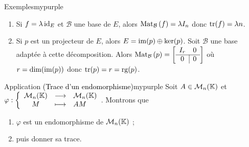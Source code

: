     \begin{omed}{Exemples}{mypurple}
        \begin{enumerate}[label=\textcolor{mypurple}{\arabic*.}]
            \item Si $f = \lambda \operatorname{id}_E$ et $\mathcal{B}$ une base de $E$, alors $\text{Mat}_{\mathcal{B}}\left(f\right) = \lambda I_n$ donc $\operatorname{tr}(f) = \lambda n$.
            \item Si $p$ est un projecteur de $E$, alors $E = \operatorname{im}(p) \oplus \ker(p)$. Soit $\mathcal{B}$ une base adaptée à cette décomposition. Alors $\text{Mat}_{\mathcal{B}}\left(p\right) = \left[ \begin{array}{c | c}
                I_r & 0 \\
                \hline
                0 & 0
            \end{array} \right]$ où $r = \dim(\operatorname{im}(p))$ donc $\operatorname{tr}(p) = r = \operatorname{rg}(p)$.
        \end{enumerate}
    \end{omed}

    \begin{omed}{Application \textcolor{black}{(Trace d’un endomorphisme)}}{mypurple}
        Soit $A \in \mathcal{M}_{n}(\mathbb{K})$ et $\fonction{\varphi}{\mk{n}}{\mk{n}}{M}{AM}$.
        Montrons que 
        \begin{enumerate}[label = \textcolor{mypurple}{\alph* |}]
            \item $\varphi$ est un endomorphisme de $\mathcal{M}_{n}(\mathbb{K})$ ;
            \item puis donner sa trace.
        \end{enumerate}
    \end{omed}

